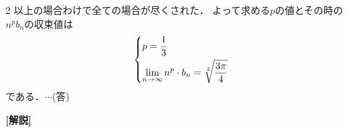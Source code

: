 \documentclass[../../main.tex]{subfiles}
\begin{document}
\begin{multicols}{2}
  以上の場合わけで全ての場合が尽くされた．
  よって求める$p$の値とその時の$n^{p}b_n$の収束値は
  \begin{align}
    \begin{dcases}
      p = \dfrac{1}{3} \\
      \lim_{n\to\infty} n^p \cdot b_n = \sqrt[3]{\dfrac{3\pi}{4}}
    \end{dcases}
  \end{align}
  である．$\cdots$(答)

  {\bf [解説]}

  \newpage
\end{multicols}
\end{document}
